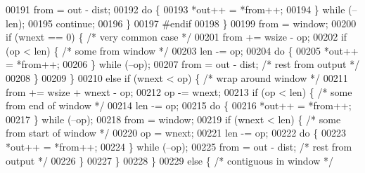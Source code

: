 \begin{DoxyCode}
{{{{{00191                             from = out - dist;
00192                             \textcolor{keywordflow}{do} \{
00193                                 *out++ = *from++;
00194                             \} \textcolor{keywordflow}{while} (--len);
00195                             \textcolor{keywordflow}{continue};
00196                         \}
00197 \textcolor{preprocessor}{#endif}
00198                     \}
00199                     from = window;
00200                     \textcolor{keywordflow}{if} (wnext == 0) \{           \textcolor{comment}{/* very common case */}
00201                         from += wsize - op;
00202                         \textcolor{keywordflow}{if} (op < len) \{         \textcolor{comment}{/* some from window */}
00203                             len -= op;
00204                             \textcolor{keywordflow}{do} \{
00205                                 *out++ = *from++;
00206                             \} \textcolor{keywordflow}{while} (--op);
00207                             from = out - dist;  \textcolor{comment}{/* rest from output */}
00208                         \}
00209                     \}
00210                     \textcolor{keywordflow}{else} \textcolor{keywordflow}{if} (wnext < op) \{      \textcolor{comment}{/* wrap around window */}
00211                         from += wsize + wnext - op;
00212                         op -= wnext;
00213                         \textcolor{keywordflow}{if} (op < len) \{         \textcolor{comment}{/* some from end of window */}
00214                             len -= op;
00215                             \textcolor{keywordflow}{do} \{
00216                                 *out++ = *from++;
00217                             \} \textcolor{keywordflow}{while} (--op);
00218                             from = window;
00219                             \textcolor{keywordflow}{if} (wnext < len) \{  \textcolor{comment}{/* some from start of window */}
00220                                 op = wnext;
00221                                 len -= op;
00222                                 \textcolor{keywordflow}{do} \{
00223                                     *out++ = *from++;
00224                                 \} \textcolor{keywordflow}{while} (--op);
00225                                 from = out - dist;      \textcolor{comment}{/* rest from output */}
00226                             \}
00227                         \}
00228                     \}
00229                     \textcolor{keywordflow}{else} \{                      \textcolor{comment}{/* contiguous in window */}
}}}}}
\end{DoxyCode}
